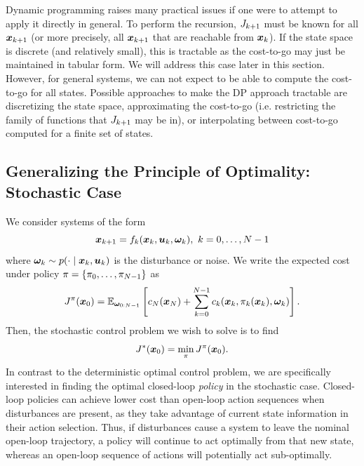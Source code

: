 Dynamic programming raises many practical issues if one were to attempt to apply it directly in general. To perform the recursion, $J_{k+1}$ must be known for all $\bm{x}_{k+1}$ (or more precisely, all $\bm{x}_{k+1}$ that are reachable from $\bm{x}_k$). If the state space is discrete (and relatively small), this is tractable as the cost-to-go may just be maintained in tabular form. We will address this case later in this section. However, for general systems, we can not expect to be able to compute the cost-to-go for all states. Possible approaches to make the DP approach tractable are discretizing the state space, approximating the cost-to-go (i.e. restricting the family of functions that $J_{k+1}$ may be in), or interpolating between cost-to-go computed for a finite set of states. 





\subsection{Generalizing the Principle of Optimality: Stochastic Case}

We consider systems of the form
\begin{equation}
    \bm{x}_{k+1} = f_k(\bm{x}_k,\bm{u}_k,\bm{\omega}_k), \,\, k=0,\ldots,N-1
\end{equation}
where $\bm{\omega}_k \sim p(\cdot \mid \bm{x}_k, \bm{u}_k)$ is the disturbance or noise. We write the expected cost under policy $\pi = \{\pi_0, \ldots, \pi_{N-1}\}$ as
\begin{equation}
    \label{eq:stoch_bellman}
    J^\pi(\bm{x}_0) = \mathbb{E}_{\bm{\omega}_{0:N-1}} \left[ c_N(\bm{x}_N) + \sum_{k=0}^{N-1} c_k(\bm{x}_k,\pi_k(\bm{x}_k),\bm{\omega}_k) \right].
\end{equation}
Then, the stochastic control problem we wish to solve is to find
\begin{equation}
    J^*(\bm{x}_0) = \min_\pi J^\pi(\bm{x}_0).
\end{equation}
In contrast to the deterministic optimal control problem, we are specifically interested in finding the optimal closed-loop \textit{policy} in the stochastic case. Closed-loop policies can achieve lower cost than open-loop action sequences when disturbances are present, as they take advantage of current state information in their action selection. Thus, if disturbances cause a system to leave the nominal open-loop trajectory, a policy will continue to act optimally from that new state, whereas an open-loop sequence of actions will potentially act sub-optimally. 


